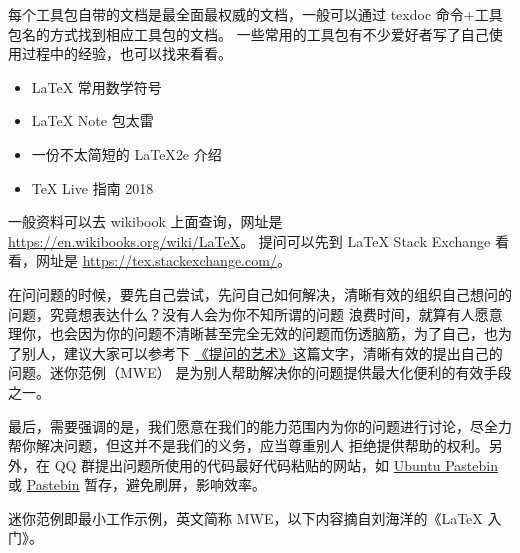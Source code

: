 







每个工具包自带的文档是最全面最权威的文档，一般可以通过 texdoc
命令+工具包名的方式找到相应工具包的文档。
一些常用的工具包有不少爱好者写了自己使用过程中的经验，也可以找来看看。


\begin{itemize}
  \item \LaTeX{} 常用数学符号
  \item \LaTeX{} Note 包太雷
  \item 一份不太简短的 \LaTeX{2e} 介绍
  \item \TeX{} Live 指南 2018
\end{itemize}


一般资料可以去 wikibook 上面查询，网址是
\url{https://en.wikibooks.org/wiki/LaTeX}。
提问可以先到 \LaTeX{} Stack Exchange 看看，网址是
\url{https://tex.stackexchange.com/}。



在问问题的时候，要先自己尝试，先问自己如何解决，清晰有效的组织自己想问的问题，究竟想表达什么？没有人会为你不知所谓的问题
浪费时间，就算有人愿意理你，也会因为你的问题不清晰甚至完全无效的问题而伤透脑筋，为了自己，也为了别人，建议大家可以参考下
\href{https://www.jianshu.com/p/f96aa7f7bf59}{《提问的艺术》}这篇文字，清晰有效的提出自己的问题。迷你范例（MWE）
是为别人帮助解决你的问题提供最大化便利的有效手段之一。

最后，需要强调的是，我们愿意在我们的能力范围内为你的问题进行讨论，尽全力帮你解决问题，但这并不是我们的义务，应当尊重别人
拒绝提供帮助的权利。另外，在 QQ 群提出问题所使用的代码最好代码粘贴的网站，如
\href{https://paste.ubuntu.com/}{Ubuntu Pastebin}
或
\href{https://pastebin.com/}{Pastebin}
暂存，避免刷屏，影响效率。


迷你范例即最小工作示例，英文简称 MWE，以下内容摘自刘海洋的《\LaTeX{} 入门》。

